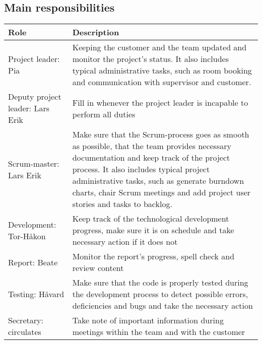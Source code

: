 \subsection{Main responsibilities}
\begin{table}[H]
\centering
{}
\begin{tabular}{|l|p{9.4cm}|}
\hline
\textbf{Role} & \textbf{Description}\\\hline
Project leader: Pia & Keeping the customer and the team updated and monitor the project's status. It also includes typical administrative tasks, such as room booking and communication with supervisor and customer.\\\hline
Deputy project leader: Lars Erik & Fill in whenever the project leader is incapable to perform all duties\\\hline
Scrum-master: Lars Erik & Make sure that the Scrum-process goes as smooth as possible, that the team provides necessary documentation and keep track of the project process. It also includes typical project administrative tasks, such as generate burndown charts, chair Scrum meetings and add project user stories and tasks to backlog.\\\hline
Development: Tor-Håkon & Keep track of the technological development progress, make sure it is on schedule and take necessary action if it does not\\\hline
Report: Beate & Monitor the report's progress, spell check and review content\\\hline
Testing: Håvard & Make sure that the code is properly tested during the development process to detect possible errors, deficiencies and bugs and take the necessary action \\\hline
Secretary: circulates & Take note of important information during meetings within the team and with the customer\\\hline
\end{tabular}
\end{table}
